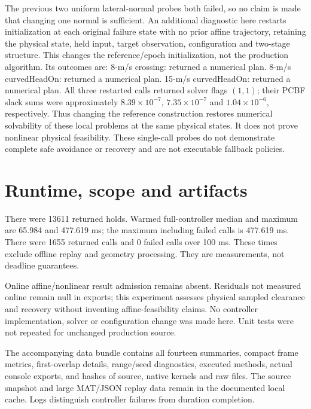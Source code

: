 \documentclass[11pt]{article}
\begin{document}
The previous two uniform lateral-normal probes both failed, so no claim is
made that changing one normal is sufficient. An additional diagnostic here
restarts initialization at each original failure state with no prior affine
trajectory, retaining the physical state, held input, target observation,
configuration and two-stage structure. This changes the reference/epoch
initialization, not the production algorithm. Its outcomes are:
8-m/s crossing: returned a numerical plan. 8-m/s curvedHeadOn: returned a numerical plan. 15-m/s curvedHeadOn: returned a numerical plan.
All three restarted calls returned solver flags $(1,1)$; their PCBF slack
sums were approximately $8.39\times10^{-7}$, $7.35\times10^{-7}$ and
$1.04\times10^{-6}$, respectively. Thus changing the reference construction
restores numerical solvability of these local problems at the same physical
states. It does not prove nonlinear physical feasibility.
These single-call probes do not demonstrate complete safe avoidance or
recovery and are not executable fallback policies.

\section{Runtime, scope and artifacts}
There were 13611 returned holds. Warmed full-controller median and maximum are 65.984 and 477.619 ms; the maximum including failed calls is 477.619 ms. There were 1655 returned calls and 0 failed calls over 100 ms. These times exclude offline replay and geometry processing. They are measurements, not deadline guarantees.


Online affine/nonlinear result admission remains absent. Residuals not measured
online remain null in exports; this experiment assesses physical sampled
clearance and recovery without inventing affine-feasibility claims. No
controller implementation, solver or configuration change was made here.
Unit tests were not repeated for unchanged production source.

The accompanying data bundle contains all fourteen summaries, compact frame
metrics, first-overlap details, range/seed diagnostics, executed methods,
actual console exports, and hashes of source, native kernels and raw files.
The source snapshot and large MAT/JSON replay data remain in the documented
local cache. Logs distinguish controller failures from duration completion.
\end{document}
